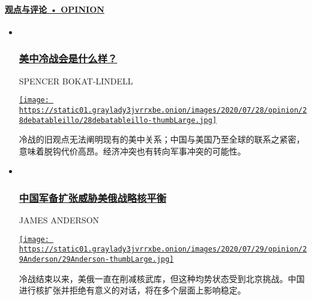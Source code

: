 \hypertarget{ux89c2ux70b9ux4e0eux8bc4ux8bba--opinion}{%
\paragraph{\texorpdfstring{\href{/opinion}{观点与评论 •
OPINION}}{观点与评论 • OPINION}}\label{ux89c2ux70b9ux4e0eux8bc4ux8bba--opinion}}

\begin{itemize}
\item ~
  \hypertarget{ux7f8eux4e2dux51b7ux6218ux4f1aux662fux4ec0ux4e48ux6837}{%
  \subsubsection{\texorpdfstring{\href{/opinion/20200730/trump-china/}{美中冷战会是什么样？}}{美中冷战会是什么样？}}\label{ux7f8eux4e2dux51b7ux6218ux4f1aux662fux4ec0ux4e48ux6837}}

  SPENCER BOKAT-LINDELL

  \href{/opinion/20200730/trump-china/}{\texttt{[image: https://static01.graylady3jvrrxbe.onion/images/2020/07/28/opinion/28debatableillo/28debatableillo-thumbLarge.jpg]}}

  冷战的旧观点无法阐明现有的美中关系；中国与美国乃至全球的联系之紧密，意味着脱钩代价高昂。经济冲突也有转向军事冲突的可能性。
\item ~
  \hypertarget{ux4e2dux56fdux519bux5907ux6269ux5f20ux5a01ux80c1ux7f8eux4fc4ux6218ux7565ux6838ux5e73ux8861}{%
  \subsubsection{\texorpdfstring{\href{/opinion/20200730/russia-china-nuclear-weapons/}{中国军备扩张威胁美俄战略核平衡}}{中国军备扩张威胁美俄战略核平衡}}\label{ux4e2dux56fdux519bux5907ux6269ux5f20ux5a01ux80c1ux7f8eux4fc4ux6218ux7565ux6838ux5e73ux8861}}

  JAMES ANDERSON

  \href{/opinion/20200730/russia-china-nuclear-weapons/}{\texttt{[image: https://static01.graylady3jvrrxbe.onion/images/2020/07/29/opinion/29Anderson/29Anderson-thumbLarge.jpg]}}

  冷战结束以来，美俄一直在削减核武库，但这种均势状态受到北京挑战。中国进行核扩张并拒绝有意义的对话，将在多个层面上影响稳定。
\end{itemize}


